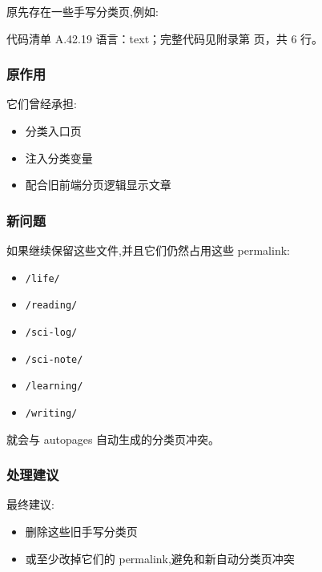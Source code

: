 \documentclass[lang=cn,scheme=chinese,color=blue,device=normal,toc=onecol,math=cm]{elegantbook}
\begin{document}
原先存在一些手写分类页,例如:\par


\begin{codeindexbox}{代码清单 A.42.19}
语言：text；完整代码见附录第 \pageref{code:42:19} 页，共 6 行。
\end{codeindexbox}


\subsubsection{原作用}


它们曾经承担:\par


\begin{itemize}
\item 分类入口页
\item 注入分类变量
\item 配合旧前端分页逻辑显示文章
\end{itemize}


\subsubsection{新问题}


如果继续保留这些文件,并且它们仍然占用这些 permalink:\par


\begin{itemize}
\item \texttt{/\allowbreak{}life/\allowbreak{}}
\item \texttt{/\allowbreak{}reading/\allowbreak{}}
\item \texttt{/\allowbreak{}sci-log/\allowbreak{}}
\item \texttt{/\allowbreak{}sci-note/\allowbreak{}}
\item \texttt{/\allowbreak{}learning/\allowbreak{}}
\item \texttt{/\allowbreak{}writing/\allowbreak{}}
\end{itemize}


就会与 autopages 自动生成的分类页冲突。\par


\subsubsection{处理建议}


最终建议:\par


\begin{itemize}
\item 删除这些旧手写分类页
\item 或至少改掉它们的 permalink,避免和新自动分类页冲突
\end{itemize}
\end{document}

